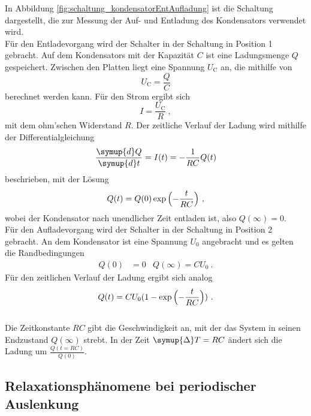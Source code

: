     In Abbildung \ref{fig:schaltung_kondensatorEntAufladung} ist die Schaltung dargestellt,
    die zur Messung der Auf- und Entladung des Kondensators verwendet wird.\\
    Für den Entladevorgang wird der Schalter in der Schaltung in Position 1 gebracht.
    Auf dem Kondensators mit der Kapazität $C$ ist eine Ladungsmenge $Q$ gespeichert.
    Zwischen den Platten liegt eine Spannung $U_\text{C}$ an,
    die mithilfe von
    \begin{equation}
        U_\text{C} = \frac{Q}{C}
        \label{eqn:kondensatorspannung}
    \end{equation}
    berechnet werden kann.
    Für den Strom ergibt sich
    \begin{equation}
        I = \frac{U_\text{C}}{R} \ ,
        \label{eqn:strom_ohmgesetz}
    \end{equation}
    mit dem ohm'schen Widerstand $R$.
    Der zeitliche Verlauf der Ladung wird mithilfe der Differentialgleichung
    \begin{equation}
        \frac{\symup{d}Q}{\symup{d}t} = I(t) = - \frac{1}{RC} Q(t)
        \label{eqn:dgl_ladung}
    \end{equation}
    beschrieben,
    mit der Lösung
    \begin{equation}
        Q(t) = Q(0) \exp{\Bigl(- \frac{t}{RC}\Bigr)} \ ,
        \label{eqn:entladung}
    \end{equation}
    wobei der Kondensator nach unendlicher Zeit entladen ist,
    also $Q(\infty) = 0$. \\
    Für den Aufladevorgang wird der Schalter in der Schaltung in Position 2 gebracht.
    An dem Kondensator ist eine Spannung $U_0$ angebracht und es gelten die Randbedingungen
    \begin{align*}
        Q(0) &= 0 & Q(\infty) = C U_0 \ .
    \end{align*}
    Für den zeitlichen Verlauf der Ladung ergibt sich analog
    \begin{equation}
        Q(t) = C U_0 (1 - \exp{\Bigl(-\frac{t}{RC}\Bigr)}) \ .
        \label{eqn:aufladung}
    \end{equation}
    \\
    Die Zeitkonstante $RC$ gibt die Geschwindigkeit an,
    mit der das System in seinen Endzustand $Q(\infty)$ strebt.
    In der Zeit $\symup{\Delta}T = RC$ ändert sich die Ladung um $\frac{Q(t=RC)}{Q(0)}$.

\subsection{Relaxationsphänomene bei periodischer Auslenkung}

